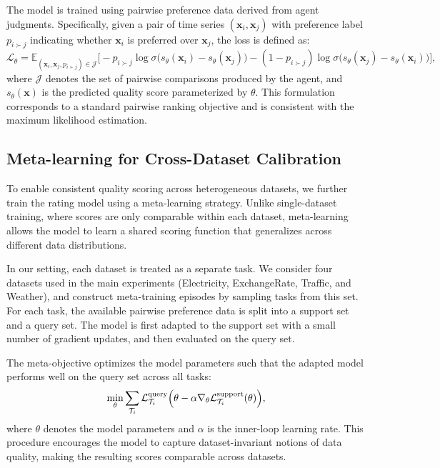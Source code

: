 \documentclass{article}
\begin{document}
The model is trained using pairwise preference data derived from agent judgments. Specifically, given a pair of time series $(\mathbf{x}_i, \mathbf{x}_j)$ with preference label $p_{i \succ j}$ indicating whether $\mathbf{x}_i$ is preferred over $\mathbf{x}_j$, the loss is defined as:
\begin{equation}
\label{eq:rating_loss}
\mathcal{L}_\theta = 
\mathbb{E}_{(\mathbf{x}_i, \mathbf{x}_j, p_{i \succ j}) \in \mathcal{J}}
\Big[
- p_{i \succ j} \log \sigma\big(s_\theta(\mathbf{x}_i) - s_\theta(\mathbf{x}_j)\big)
- (1 - p_{i \succ j}) \log \sigma\big(s_\theta(\mathbf{x}_j) - s_\theta(\mathbf{x}_i)\big)
\Big],
\end{equation}
where $\mathcal{J}$ denotes the set of pairwise comparisons produced by the agent, and $s_\theta(\mathbf{x})$ is the predicted quality score parameterized by $\theta$. This formulation corresponds to a standard pairwise ranking objective and is consistent with the maximum likelihood estimation.


\subsection{Meta-learning for Cross-Dataset Calibration}
\label{app:meta_learning}
To enable consistent quality scoring across heterogeneous datasets, we further train the rating model using a meta-learning strategy. Unlike single-dataset training, where scores are only comparable within each dataset, meta-learning allows the model to learn a shared scoring function that generalizes across different data distributions.

In our setting, each dataset is treated as a separate task. We consider four datasets used in the main experiments (Electricity, ExchangeRate, Traffic, and Weather), and construct meta-training episodes by sampling tasks from this set. For each task, the available pairwise preference data is split into a support set and a query set. The model is first adapted to the support set with a small number of gradient updates, and then evaluated on the query set.

The meta-objective optimizes the model parameters such that the adapted model performs well on the query set across all tasks:
\begin{equation}
\small
\min_{\theta} \sum_{\mathcal{T}_i}
\mathcal{L}_{\mathcal{T}_i}^{\text{query}}
\Big(
\theta - \alpha \nabla_{\theta} \mathcal{L}_{\mathcal{T}_i}^{\text{support}}(\theta)
\Big),
\end{equation}
where $\theta$ denotes the model parameters and $\alpha$ is the inner-loop learning rate. This procedure encourages the model to capture dataset-invariant notions of data quality, making the resulting scores comparable across datasets.
\end{document}

